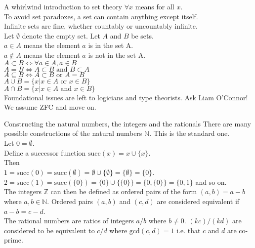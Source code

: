 \documentclass{beamer}
\begin{document}


\begin{frame}{A whirlwind introduction to set theory}
$\forall x$ means for all $x$.\\
To avoid set paradoxes, a set can contain anything except itself.\\
Infinite sets are fine, whether countably or uncountably infinite.\\
Let $\emptyset$ denote the empty set.
Let $A$ and $B$ be sets.\\
$a \in A$ means the element $a$ is in the set A.\\
$a \notin A$ means the element $a$ is not in the set A.\\
$A \subset B \Leftrightarrow \forall a \in A, a \in B$\\
$A = B \Leftrightarrow A \subset B \text{ and } B \subset A$\\
$A \subseteq B \Leftrightarrow A \subset B \text{ or } A = B$\\
$A \cup B = \{x | x \in A \text{ or } x \in B\}$\\
$A \cap B = \{x | x \in A \text{ and } x \in B\}$\\
Foundational issues are left to logicians and type theorists. Ask Liam O'Connor!\\
We assume ZFC and move on.
\end{frame}


\def \succ {\text{succ}}
\begin{frame}{Constructing the natural numbers, the integers and the rationals}
There are many possible constructions of the natural numbers $\mathbb{N}$. This is the standard one.\\
Let $0 = \emptyset$. \\
Define a successor function $\succ{(x)} = x \cup \{ x \}$.\\
Then\\
$1 = \succ(0) = \succ(\emptyset) = \emptyset \cup \{ \emptyset \} = \{\emptyset\} = \{ 0 \}$.\\
$2 = \succ(1) = \succ(\{ 0 \}) = \{ 0 \} \cup \{ \{ 0 \} \} = \{ 0, \{ 0 \} \} = \{0, 1\}$ and so on.\\
The integers $\mathbb{Z}$ can then be defined as ordered pairs of the form $(a, b) = a - b$ where $a, b \in \mathbb{N}$. Ordered pairs $(a, b)$ and $(c, d)$ are considered equivalent if $a - b = c -d$.\\
The rational numbers are ratios of integers $a / b$ where $b \ne 0$.
$(k c) / (k d)$ are considered to be equivalent to $c / d$ where $\text{gcd}(c, d) = 1$ i.e. that $c$ and $d$
are co-prime.
\end{frame}
\end{document}
